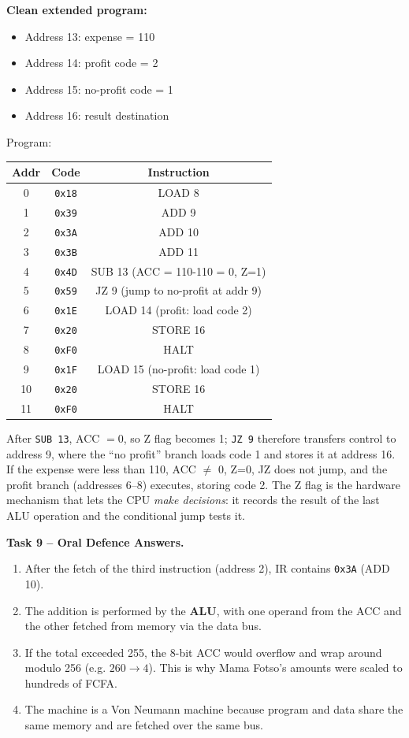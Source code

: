 \documentclass[11pt]{article}
\begin{document}
\textbf{Clean extended program:}
\begin{itemize}
\item Address 13: expense = 110
\item Address 14: profit code = 2
\item Address 15: no-profit code = 1
\item Address 16: result destination
\end{itemize}
Program:
\begin{center}
\begin{tabular}{|c|c|c|}
\hline
\rowcolor{popblueL} \textbf{Addr} & \textbf{Code} & \textbf{Instruction} \\
\hline
0 & \texttt{0x18} & LOAD 8 \\
1 & \texttt{0x39} & ADD 9 \\
2 & \texttt{0x3A} & ADD 10 \\
3 & \texttt{0x3B} & ADD 11 \\
4 & \texttt{0x4D} & SUB 13 \quad (ACC = 110-110 = 0, Z=1) \\
5 & \texttt{0x59} & JZ 9 \quad (jump to no-profit at addr 9) \\
6 & \texttt{0x1E} & LOAD 14 \quad (profit: load code 2) \\
7 & \texttt{0x20} & STORE 16 \\
8 & \texttt{0xF0} & HALT \\
9 & \texttt{0x1F} & LOAD 15 \quad (no-profit: load code 1) \\
10 & \texttt{0x20} & STORE 16 \\
11 & \texttt{0xF0} & HALT \\
\hline
\end{tabular}
\end{center}
After \texttt{SUB 13}, ACC $= 0$, so Z flag becomes 1; \texttt{JZ 9} therefore transfers control to address 9, where the ``no profit'' branch loads code 1 and stores it at address 16. If the expense were less than 110, ACC $\neq$ 0, Z=0, JZ does not jump, and the profit branch (addresses 6--8) executes, storing code 2. The Z flag is the hardware mechanism that lets the CPU \emph{make decisions}: it records the result of the last ALU operation and the conditional jump tests it.

\textbf{Task 9 -- Oral Defence Answers.}
\begin{enumerate}
\item After the fetch of the third instruction (address 2), IR contains \texttt{0x3A} (ADD 10).
\item The addition is performed by the \textbf{ALU}, with one operand from the ACC and the other fetched from memory via the data bus.
\item If the total exceeded 255, the 8-bit ACC would overflow and wrap around modulo 256 (e.g. $260 \rightarrow 4$). This is why Mama Fotso's amounts were scaled to hundreds of FCFA.
\item The machine is a Von Neumann machine because program and data share the same memory and are fetched over the same bus.
\end{enumerate}
\end{document}
